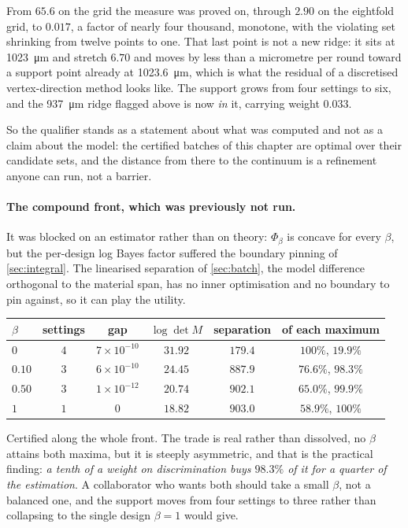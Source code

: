 \documentclass[10pt]{article}
\begin{document}
\noindent From $65.6$ on the grid the measure was proved on, through $2.90$ on the eightfold
grid, to $0.017$, a factor of nearly four thousand, monotone, with the violating set shrinking
from twelve points to one. That last point is not a new ridge: it sits at
\SI{1023}{\micro\metre} and stretch $6.70$ and moves by less than a micrometre per round toward
a support point already at \SI{1023.6}{\micro\metre}, which is what the residual of a
discretised vertex-direction method looks like. The support grows from four settings to six, and
the \SI{937}{\micro\metre} ridge flagged above is now \emph{in} it, carrying
weight $0.033$.

So the qualifier stands as a statement about what was computed and not as a claim about the
model: the certified batches of this chapter are optimal over their candidate sets, and the
distance from there to the continuum is a refinement anyone can run, not a barrier.

\paragraph{The compound front, which was previously not run.} It was blocked on an estimator
rather than on theory: $\Phi_\beta$ is concave for every $\beta$, but the per-design log Bayes
factor suffered the boundary pinning of \cref{sec:integral}. The linearised separation of
\cref{sec:batch}, the model difference orthogonal to the material span, has no inner
optimisation and no boundary to pin against, so it can play the utility.

\begin{center}
\begin{tabular}{lccccc}
\toprule
$\beta$ & settings & gap & $\log\det M$ & separation & of each maximum \\
\midrule
$0$ & $4$ & $7\times10^{-10}$ & $\mathbf{31.92}$ & $179.4$ & $100\%$, $19.9\%$ \\
$0.10$ & $3$ & $6\times10^{-10}$ & $24.45$ & $887.9$ & $76.6\%$, $98.3\%$ \\
$0.50$ & $3$ & $1\times10^{-12}$ & $20.74$ & $902.1$ & $65.0\%$, $99.9\%$ \\
$1$ & $1$ & $0$ & $18.82$ & $\mathbf{903.0}$ & $58.9\%$, $100\%$ \\
\bottomrule
\end{tabular}
\end{center}

\noindent Certified along the whole front. The trade is real rather than dissolved, no
$\beta$ attains both maxima, but it is steeply asymmetric, and that is the practical finding:
\emph{a tenth of a weight on discrimination buys $98.3\%$ of it for a quarter of the estimation}.
A collaborator who wants both should take a small $\beta$, not a balanced one, and the support
moves from four settings to three rather than collapsing to the single design $\beta = 1$ would
give.
\end{document}
